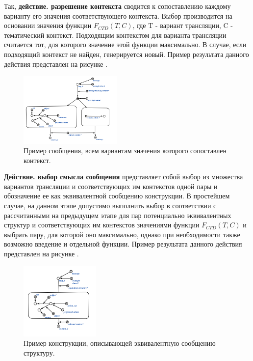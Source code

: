 Так, \textbf{действие. разрешение контекста} сводится к сопоставлению каждому варианту его значения соответствующего контекста.
Выбор производится на основании значения функции $F_{CTD}(T, C)$, где T - вариант трансляции, C - тематический контекст.
Подходящим контекстом для варианта трансляции считается тот, для которого значение этой функции максимально.
В случае, если подходящий контекст не найден, генерируется новый.
Пример результата данного действия представлен на рисунке \textit{}.

\begin{figure}[h]
    \centering
    \includegraphics[width=0.45\textwidth]{images/part4/chapter_nl_interfaces/relevant_contexts.png}
    \caption{Пример сообщения, всем вариантам значения которого сопоставлен контекст.}
    \label{fig:relevant_contexts}
\end{figure}

\textbf{Действие. выбор смысла сообщения} представляет собой выбор из множества вариантов трансляции и соответствующих им контекстов одной пары и обозначение ее как эквивалентной сообщению конструкции. В простейшем случае, на данном этапе допустимо выполнить выбор в соответствии с рассчитанными на предыдущем этапе для пар потенциально эквивалентных структур и соответствующих им контекстов значениями функции $F_{CTD}(T, C)$ и выбрать пару, для которой оно максимально, однако при необходимости также возможно введение и отдельной функции.
Пример результата данного действия представлен на рисунке \textit{}.

\begin{figure}[h]
    \centering
    \includegraphics[width=0.35\textwidth]{images/part4/chapter_nl_interfaces/message_equivalent_structure.png}
    \caption{Пример конструкции, описывающей эквивалентную сообщению структуру.}
    \label{fig:message_equivalent_structure}
\end{figure}

